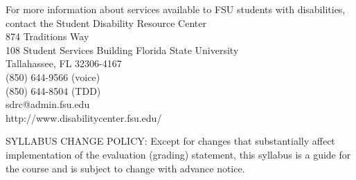 \documentclass[12pt,oneside]{amsart}
\begin{document}
For more information about services available to FSU students with disabilities, contact the
 Student Disability Resource Center
\\
874 Traditions Way
\\
108 Student Services Building
Florida State University
\\
Tallahassee, FL 32306-4167
\\
(850) 644-9566 (voice)
\\
(850) 644-8504 (TDD)
\\
sdrc@admin.fsu.edu
\\
http://www.disabilitycenter.fsu.edu/




\noindent SYLLABUS CHANGE POLICY:
Except for changes that substantially affect implementation of the evaluation (grading) statement, this syllabus is a guide for the course and is subject to change with advance notice.
\end{document}
